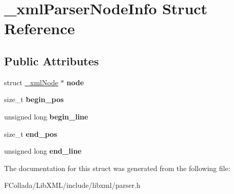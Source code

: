 \hypertarget{struct__xmlParserNodeInfo}{
\section{\_\-xmlParserNodeInfo Struct Reference}
\label{struct__xmlParserNodeInfo}
}
\subsection*{Public Attributes}
\begin{DoxyCompactItemize}
\item 
\hypertarget{struct__xmlParserNodeInfo_a6673411b2cf765abb2e0c43cc83ee94a}{
struct \hyperlink{struct__xmlNode}{\_\-xmlNode} $\ast$ {\bfseries node}}
\label{struct__xmlParserNodeInfo_a6673411b2cf765abb2e0c43cc83ee94a}

\item 
\hypertarget{struct__xmlParserNodeInfo_a4b8439b81007e5f541dd5194f1001d06}{
size\_\-t {\bfseries begin\_\-pos}}
\label{struct__xmlParserNodeInfo_a4b8439b81007e5f541dd5194f1001d06}

\item 
\hypertarget{struct__xmlParserNodeInfo_a3448ffcf43452efe92349091c18f7a79}{
unsigned long {\bfseries begin\_\-line}}
\label{struct__xmlParserNodeInfo_a3448ffcf43452efe92349091c18f7a79}

\item 
\hypertarget{struct__xmlParserNodeInfo_adcf6545f0b628156828bf6195c3601d4}{
size\_\-t {\bfseries end\_\-pos}}
\label{struct__xmlParserNodeInfo_adcf6545f0b628156828bf6195c3601d4}

\item 
\hypertarget{struct__xmlParserNodeInfo_a97d627e7277aea0cca01ba5ca08c93cd}{
unsigned long {\bfseries end\_\-line}}
\label{struct__xmlParserNodeInfo_a97d627e7277aea0cca01ba5ca08c93cd}

\end{DoxyCompactItemize}


The documentation for this struct was generated from the following file:\begin{DoxyCompactItemize}
\item 
FCollada/LibXML/include/libxml/parser.h\end{DoxyCompactItemize}

